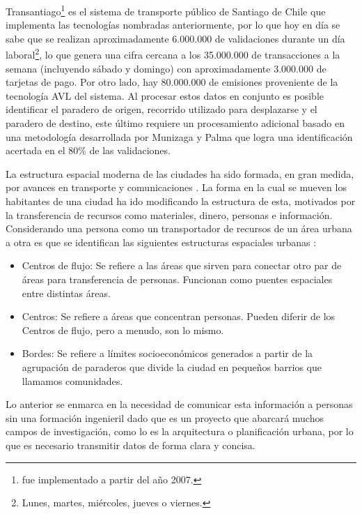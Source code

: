 \documentclass[12pt]{article}
\begin{document}
    Transantiago\footnote{fue implementado a partir del año 2007.} es el sistema de transporte público de Santiago de Chile que implementa las tecnologías nombradas anteriormente, por lo que hoy en día se sabe que se realizan aproximadamente 6.000.000 de validaciones durante un día laboral\footnote{Lunes, martes, miércoles, jueves o viernes.}, lo que genera una cifra cercana a los 35.000.000 de transacciones a la semana (incluyendo sábado y domingo) con aproximadamente 3.000.000 de tarjetas de pago. Por otro lado, hay 80.000.000 de emisiones proveniente de la tecnología AVL del sistema. Al procesar estos datos en conjunto es posible identificar el paradero de origen, recorrido utilizado para desplazarse y el paradero de destino, este último requiere un procesamiento adicional basado en una metodología desarrollada por Munizaga y Palma \cite{Procesamiento_datos} que logra una identificación acertada en el 80\% de las validaciones.

    La estructura espacial moderna de las ciudades ha sido formada, en gran medida, por avances en transporte y comunicaciones \cite{Forma_ciudad_moderna}. La forma en la cual se mueven los habitantes de una ciudad ha ido modificando la estructura de esta, motivados por la transferencia de recursos como materiales, dinero, personas e información. Considerando una persona como un transportador de recursos de un área urbana a otra es que se identifican las siguientes estructuras espaciales urbanas \cite{Estructura_urbana}:

    \begin{itemize}
    \item Centros de flujo: Se refiere a las áreas que sirven para conectar otro par de áreas para transferencia de personas. Funcionan como puentes espaciales entre distintas áreas.
    \item Centros: Se refiere a áreas que concentran personas. Pueden diferir de los Centros de flujo, pero a menudo, son lo mismo.
    \item Bordes: Se refiere a límites socioeconómicos generados a partir de la agrupación de paraderos que divide la ciudad en pequeños barrios que llamamos comunidades.
    \end{itemize}


    Lo anterior se enmarca en la necesidad de comunicar esta información a personas sin una formación ingenieril dado que es un proyecto que abarcará muchos campos de investigación, como lo es la arquitectura o planificación urbana, por lo que es necesario transmitir datos de forma clara y concisa.
\end{document}

